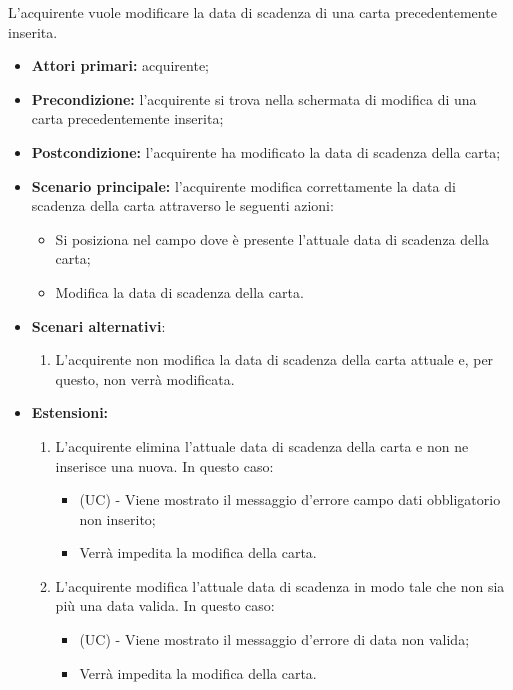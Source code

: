 L'acquirente vuole modificare la data di scadenza di una carta precedentemente inserita.
\begin{itemize}
    \item \textbf{Attori primari:} acquirente;
    \item \textbf{Precondizione:} l'acquirente si trova nella schermata di modifica di una carta precedentemente inserita;
    \item \textbf{Postcondizione:} l'acquirente ha modificato la data di scadenza della carta;
    \item \textbf{Scenario principale:} l'acquirente modifica correttamente la data di scadenza della carta attraverso le seguenti azioni:
    \begin{itemize}
        \item Si posiziona nel campo dove è presente l'attuale data di scadenza della carta;
        \item Modifica la data di scadenza della carta.
    \end{itemize}
    \item \textbf{Scenari alternativi}:
    \begin{enumerate}[label=\lett]
        \item L'acquirente non modifica la data di scadenza della carta attuale e, per questo, non verrà modificata.
    \end{enumerate}
    \item \textbf{Estensioni:}
    \begin{enumerate}[label=\lett]
        \item L'acquirente elimina l'attuale data di scadenza della carta e non ne inserisce una nuova. In questo caso:
        \begin{itemize}
            \item (UC) - Viene mostrato il messaggio d'errore campo dati obbligatorio non inserito;
            \item Verrà impedita la modifica della carta.
        \end{itemize}
        \item L'acquirente modifica l'attuale data di scadenza in modo tale che non sia più una data valida. In questo caso:
        \begin{itemize}
            \item (UC) - Viene mostrato il messaggio d'errore di data non valida;
            \item Verrà impedita la modifica della carta.
        \end{itemize}
    \end{enumerate}
\end{itemize}

